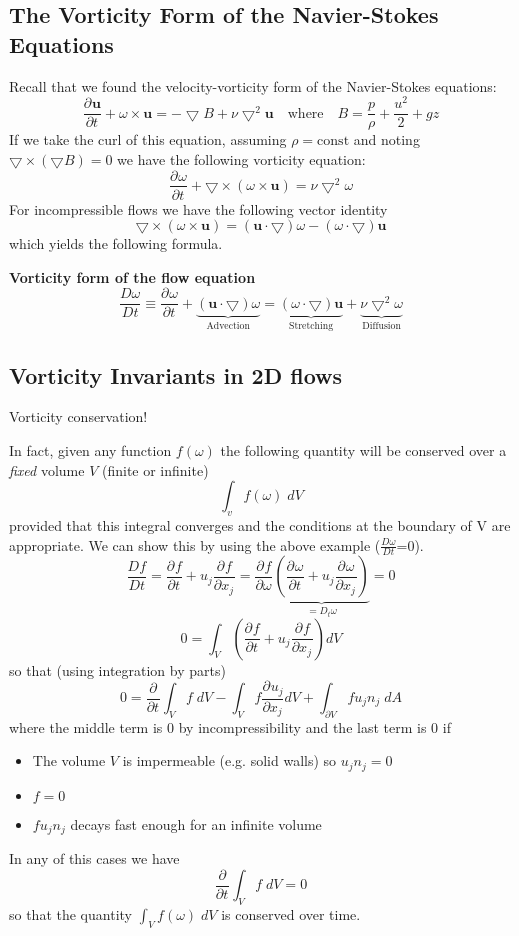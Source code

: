 \documentclass[11pt]{article}
\newcommand*{\pd}[3][]{\ensuremath{\frac{\partial^{#1} {#2}}{\partial {#3}^{#1}}}}
\newcommand*{\md}[1]{\ensuremath{\frac{D #1}{D t}}}
\newcommand{\grad}{\bigtriangledown}
\newcommand{\mv}[1]{\textbf{#1}}
\newenvironment{eg}
    {\begin{mdframed}[backgroundcolor=mylg, roundcorner=5pt, linewidth=0pt]}
    {\end{mdframed}}
\newenvironment{formula}
	{\begin{mdframed}[backgroundcolor=white, roundcorner=5pt, linewidth=1pt, linecolor=red]}
	{\end{mdframed}}
\begin{document}
\subsection{The Vorticity Form of the Navier-Stokes Equations}
Recall that we found the velocity-vorticity form of the Navier-Stokes equations:
$$\pd{\mv{u}}{t}+\omega\times\mv{u}=-\grad B+\nu\grad^2\mv{u}\quad\text{where}\quad B=\frac{p}{\rho}+\frac{u^2}{2}+gz$$
If we take the curl of this equation, assuming $\rho=\text{const}$ and noting $\grad\times(\grad B)=0$ we have the following vorticity equation:
$$\pd{\omega}{t}+\grad\times(\omega\times\mv{u})=\nu\grad^2\omega$$
For incompressible flows we have the following vector identity
$$\grad\times(\omega\times\mv{u})=(\mv{u}\cdot\grad)\omega-(\omega\cdot\grad)\mv{u}$$
which yields the following formula.
\begin{formula}
	\textbf{Vorticity form of the flow equation}
	$$\md{\omega}\equiv\pd{\omega}{t}+\underbrace{(\mv{u}\cdot\grad)\omega}_{\text{Advection}}=\underbrace{(\omega\cdot\grad)\mv{u}}_{\text{Stretching}}+\underbrace{\nu\grad^2\omega}_{\text{Diffusion}}$$
\end{formula}
\subsection{Vorticity Invariants in 2D flows}
\begin{eg}
Vorticity conservation!
\end{eg}
In fact, given any function $f(\omega)$ the following quantity will be conserved over a \emph{fixed} volume $V$ (finite or infinite)
$$\int_v f(\omega)\;dV$$
provided that this integral converges and the conditions at the boundary of V are appropriate. We can show this by using the above example ($\md{\omega}$=0).
$$\md{f}=\pd{f}{t}+u_j\pd{f}{x_j}=\pd{f}{\omega}\underbrace{\left(\pd{\omega}{t}+u_j\pd{\omega}{x_j}\right)}_{=D_t\omega}=0$$
$$0=\int_V\left(\pd{f}{t}+u_j\pd{f}{x_j}\right)dV$$
so that (using integration by parts)
$$0=\pd{}{t}\int_V f\;dV - \int_V f\pd{u_j}{x_j}dV+\int_{\partial V} fu_jn_j\;dA$$
where the middle term is $0$ by incompressibility and the last term is $0$ if
\begin{itemize}
	\item The volume $V$ is impermeable (e.g. solid walls) so $u_jn_j=0$
	\item $f=0$
	\item $fu_jn_j$ decays fast enough for an infinite volume
\end{itemize}
In any of this cases we have
$$\pd{}{t}\int_V f\;dV=0$$
so that the quantity $\int_V f(\omega)\;dV$ is conserved over time.
\end{document}
